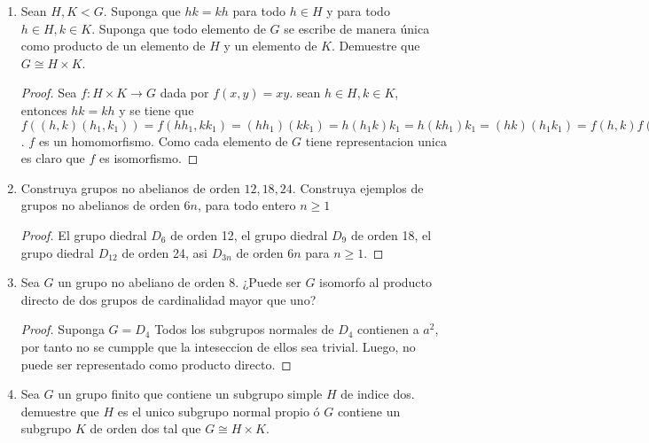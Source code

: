 \documentclass{article}
\theoremstyle{break}
\begin{document}
\begin{enumerate}
\begin{proof}
			Supongamos que $HK=G$. Sea $f:H\times K\rightarrow G$ dada por $f(h,k)=hk$. Por la primera parte $f$ es homomorfismo. Como $HK=G$ para $x\in G$ existe $ab\in HK$ tal que $x=ab$ y $f(a,b)=x$, por lo tanto $f$ es suprayectiva. y como $|H||K|=|G|$, entonces $f$ es suprayectiva.
			
		\end{proof}
		
		\item Sean $H,K<G$. Suponga que $hk=kh$ para todo $h\in H$ y para todo $h\in H, k\in K$. Suponga que todo elemento de $G$ se escribe de manera \'unica como producto de un elemento de $H$ y un elemento de $K$. Demuestre que $G\cong H\times K$.
		
		\begin{proof}
			Sea $f:H\times K\rightarrow G$ dada por $f(x,y)=xy$. sean $h\in H,k\in K$, entonces $hk=kh$ y se tiene que $f((h,k)(h_1,k_1))=f(hh_1,kk_1)=(hh_1)(kk_1)=h(h_1k)k_1=h(kh_1)k_1=(hk)(h_1k_1)=f(h,k)f(h_1,k_1)$. $f$ es un homomorfismo. Como cada elemento de $G$ tiene representacion unica es claro que $f$ es isomorfismo.
		\end{proof}
		
		\item Construya grupos no abelianos de orden $12,18,24$. Construya ejemplos de grupos no abelianos de orden $6n$, para todo entero $n\geq 1$
		
		\begin{proof}
			El grupo diedral  $D_6$ de orden 12, el grupo diedral $D_9$ de orden 18, el grupo diedral $D_{12}$ de orden 24, asi $D_{3n}$ de orden $6n$ para $n\geq 1$.
			
			
		\end{proof}
		
		\item Sea $G$ un grupo no abeliano de orden 8. ¿Puede ser $G$ isomorfo al producto directo de dos grupos de cardinalidad mayor que uno?
		
		\begin{proof}
			Suponga $G=D_4$ Todos los subgrupos normales de $D_4$ contienen a $a^2$, por tanto no se cumpple que la inteseccion de ellos sea trivial. Luego, no puede ser representado como producto directo.
		\end{proof}
		
		\item Sea $G$ un grupo finito que contiene un subgrupo simple $H$ de indice dos. demuestre que $H$ es el unico subgrupo normal propio \'o $G$ contiene un subgrupo $K$ de orden dos tal que $G\cong H\times K$.
		

\end{enumerate}
\end{document}
